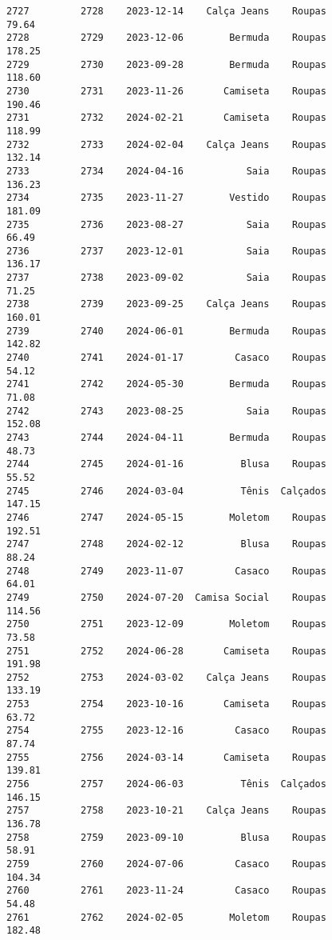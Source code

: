 \documentclass[11pt]{article}
\begin{document}
\begin{Verbatim}[commandchars=\\\{\}]
2727         2728    2023-12-14    Calça Jeans    Roupas           79.64   
2728         2729    2023-12-06        Bermuda    Roupas          178.25   
2729         2730    2023-09-28        Bermuda    Roupas          118.60   
2730         2731    2023-11-26       Camiseta    Roupas          190.46   
2731         2732    2024-02-21       Camiseta    Roupas          118.99   
2732         2733    2024-02-04    Calça Jeans    Roupas          132.14   
2733         2734    2024-04-16           Saia    Roupas          136.23   
2734         2735    2023-11-27        Vestido    Roupas          181.09   
2735         2736    2023-08-27           Saia    Roupas           66.49   
2736         2737    2023-12-01           Saia    Roupas          136.17   
2737         2738    2023-09-02           Saia    Roupas           71.25   
2738         2739    2023-09-25    Calça Jeans    Roupas          160.01   
2739         2740    2024-06-01        Bermuda    Roupas          142.82   
2740         2741    2024-01-17         Casaco    Roupas           54.12   
2741         2742    2024-05-30        Bermuda    Roupas           71.08   
2742         2743    2023-08-25           Saia    Roupas          152.08   
2743         2744    2024-04-11        Bermuda    Roupas           48.73   
2744         2745    2024-01-16          Blusa    Roupas           55.52   
2745         2746    2024-03-04          Tênis  Calçados          147.15   
2746         2747    2024-05-15        Moletom    Roupas          192.51   
2747         2748    2024-02-12          Blusa    Roupas           88.24   
2748         2749    2023-11-07         Casaco    Roupas           64.01   
2749         2750    2024-07-20  Camisa Social    Roupas          114.56   
2750         2751    2023-12-09        Moletom    Roupas           73.58   
2751         2752    2024-06-28       Camiseta    Roupas          191.98   
2752         2753    2024-03-02    Calça Jeans    Roupas          133.19   
2753         2754    2023-10-16       Camiseta    Roupas           63.72   
2754         2755    2023-12-16         Casaco    Roupas           87.74   
2755         2756    2024-03-14       Camiseta    Roupas          139.81   
2756         2757    2024-06-03          Tênis  Calçados          146.15   
2757         2758    2023-10-21    Calça Jeans    Roupas          136.78   
2758         2759    2023-09-10          Blusa    Roupas           58.91   
2759         2760    2024-07-06         Casaco    Roupas          104.34   
2760         2761    2023-11-24         Casaco    Roupas           54.48   
2761         2762    2024-02-05        Moletom    Roupas          182.48   

\end{Verbatim}
\end{document}
